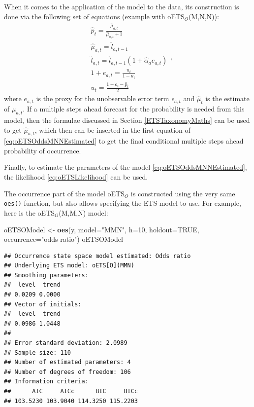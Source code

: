 \documentclass[]{book}
\newenvironment{Shaded}{\begin{snugshade}}{\end{snugshade}}
\newcommand{\DataTypeTok}[1]{\textcolor[rgb]{0.13,0.29,0.53}{#1}}
\newcommand{\DecValTok}[1]{\textcolor[rgb]{0.00,0.00,0.81}{#1}}
\newcommand{\KeywordTok}[1]{\textcolor[rgb]{0.13,0.29,0.53}{\textbf{#1}}}
\newcommand{\NormalTok}[1]{#1}
\newcommand{\OtherTok}[1]{\textcolor[rgb]{0.56,0.35,0.01}{#1}}
\newcommand{\StringTok}[1]{\textcolor[rgb]{0.31,0.60,0.02}{#1}}
\theoremstyle{definition}
\theoremstyle{definition}
\theoremstyle{definition}
\theoremstyle{definition}
\theoremstyle{remark}
\begin{document}
When it comes to the application of the model to the data, its construction is done via the following set of equations (example with oETS\(_O\)(M,N,N)):
\begin{equation}
\begin{aligned}
& \hat{p}_t = \frac{\hat{\mu}_{a,t}}{\hat{\mu}_{a,t}+1} \\
& \hat{\mu}_{a,t} = \hat{l}_{a,t-1} \\
& \hat{l}_{a,t} = \hat{l}_{a,t-1}( 1  + \hat{\alpha}_{a} e_{a,t}) \\
& 1+e_{a,t} = \frac{u_t}{1-u_t} \\
& u_{t} = \frac{1 + o_t -\hat{p}_t}{2}
\end{aligned},
\label{eq:oETSOddsMNNEstimated}
\end{equation}
where \(e_{a,t}\) is the proxy for the unobservable error term \(\epsilon_{a,t}\) and \(\hat{\mu}_t\) is the estimate of \(\mu_{a,t}\). If a multiple steps ahead forecast for the probability is needed from this model, then the formulae discussed in Section \ref{ETSTaxonomyMaths} can be used to get \(\hat{\mu}_{a,t}\), which then can be inserted in the first equation of \eqref{eq:oETSOddsMNNEstimated} to get the final conditional multiple steps ahead probability of occurrence.

Finally, to estimate the parameters of the model \eqref{eq:oETSOddsMNNEstimated}, the likelihood \eqref{eq:oETSLikelihood} can be used.

The occurrence part of the model oETS\(_O\) is constructed using the very same \texttt{oes()} function, but also allows specifying the ETS model to use. For example, here is the oETS\(_O\)(M,M,N) model:

\begin{Shaded}
\begin{Highlighting}[]
\NormalTok{oETSOModel <-}\StringTok{ }\KeywordTok{oes}\NormalTok{(y, }\DataTypeTok{model=}\StringTok{"MMN"}\NormalTok{, }\DataTypeTok{h=}\DecValTok{10}\NormalTok{, }\DataTypeTok{holdout=}\OtherTok{TRUE}\NormalTok{,}
                  \DataTypeTok{occurrence=}\StringTok{"odds-ratio"}\NormalTok{)}
\NormalTok{oETSOModel}
\end{Highlighting}
\end{Shaded}

\begin{verbatim}
## Occurrence state space model estimated: Odds ratio
## Underlying ETS model: oETS[O](MMN)
## Smoothing parameters:
##  level  trend 
## 0.0209 0.0000 
## Vector of initials:
##  level  trend 
## 0.0986 1.0448 
## 
## Error standard deviation: 2.0989
## Sample size: 110
## Number of estimated parameters: 4
## Number of degrees of freedom: 106
## Information criteria: 
##      AIC     AICc      BIC     BICc 
## 103.5230 103.9040 114.3250 115.2203
\end{verbatim}
\end{document}
